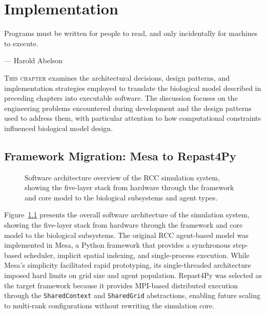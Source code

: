 \chapter{Implementation}
\label{ch:implementation}

\epigraph{Programs must be written for people to read, and only incidentally for machines to execute.}{--- Harold Abelson}

\lettrine[lines=2]{T}{his chapter} examines the architectural decisions, design patterns, and implementation strategies employed to translate the biological model described in preceding chapters into executable software. The discussion focuses on the engineering problems encountered during development and the design patterns used to address them, with particular attention to how computational constraints influenced biological model design.

\section{Framework Migration: Mesa to Repast4Py}
\label{sec:framework-migration}

\begin{figure}[htbp]
\centering
{}
\caption{Software architecture overview of the RCC simulation system, showing the five-layer stack from hardware through the framework and core model to the biological subsystems and agent types.}
\label{fig:architecture_overview}
\end{figure}

Figure~\ref{fig:architecture_overview} presents the overall software architecture of the simulation system, showing the five-layer stack from hardware through the framework and core model to the biological subsystems. The original RCC agent-based model was implemented in Mesa, a Python framework that provides a synchronous step-based scheduler, implicit spatial indexing, and single-process execution.  While Mesa's simplicity facilitated rapid prototyping, its single-threaded architecture imposed hard limits on grid size and agent population.  Repast4Py was selected as the target framework because it provides MPI-based distributed execution through the \texttt{SharedContext} and \texttt{SharedGrid} abstractions, enabling future scaling to multi-rank configurations without rewriting the simulation core.

